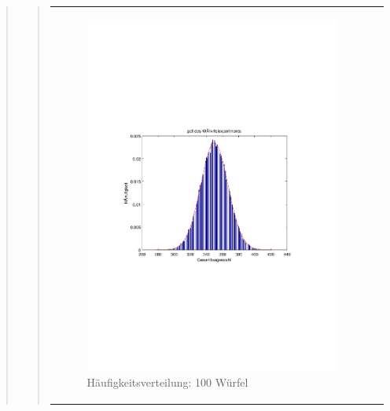 \begin{quote}
\begin{quote}
\begin{center}
\begin{tabular}{ll}
            \begin{minipage}{0.6\textwidth}
                \begin{figure}[H]
                    \label{fig:pico_funktion0alpha}
                    \includegraphics[scale=0.7, trim = 20mm 80mm 20mm 90mm, clip]{Bilder/A1_3_100}
                    \caption{Häufigkeitsverteilung: 100 Würfel}
                \end{figure}
        
            \end{minipage}
        
        \end{tabular}
        \end{center}



\end{quote}
\end{quote}
